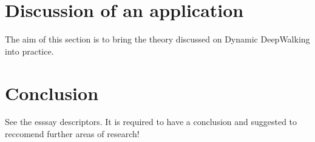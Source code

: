 \documentclass[a4paper]{article}
\begin{document}
\section{Discussion of an application}
The aim of this section is to bring the theory discussed on Dynamic DeepWalking
into practice.
\section{Conclusion}
See the esssay descriptors. It is required to have a conclusion and suggested to
reccomend further areas of research!






\printindex
\end{document}
